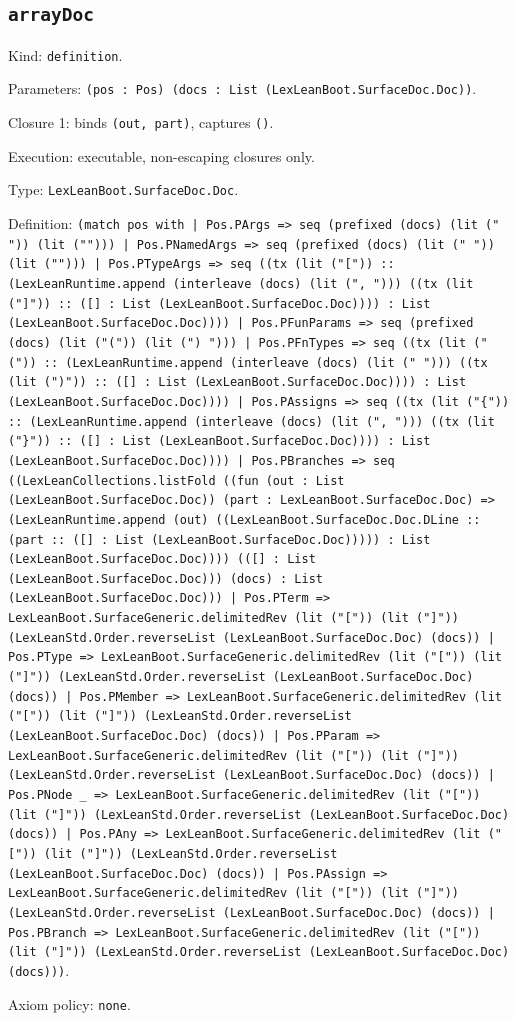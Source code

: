 \documentclass[11pt]{article}
\begin{document}
\subsection*{\texttt{arrayDoc}}
\noindent Kind: \texttt{definition}.\par
\noindent Parameters: \texttt{(pos : Pos) (docs : List (LexLeanBoot.SurfaceDoc.Doc))}.\par
\noindent Closure 1: binds \texttt{(out, part)}, captures \texttt{()}.\par
\noindent Execution: executable, non-escaping closures only.\par
\noindent Type: \texttt{LexLeanBoot.SurfaceDoc.Doc}.\par
\noindent Definition: \texttt{(match pos with | Pos.PArgs => seq (prefixed (docs) (lit (" ")) (lit (""))) | Pos.PNamedArgs => seq (prefixed (docs) (lit (" ")) (lit (""))) | Pos.PTypeArgs => seq ((tx (lit ("[")) :: (LexLeanRuntime.append (interleave (docs) (lit (", "))) ((tx (lit ("]")) :: ([] : List (LexLeanBoot.SurfaceDoc.Doc)))) : List (LexLeanBoot.SurfaceDoc.Doc)))) | Pos.PFunParams => seq (prefixed (docs) (lit ("(")) (lit (") "))) | Pos.PFnTypes => seq ((tx (lit ("(")) :: (LexLeanRuntime.append (interleave (docs) (lit (" "))) ((tx (lit (")")) :: ([] : List (LexLeanBoot.SurfaceDoc.Doc)))) : List (LexLeanBoot.SurfaceDoc.Doc)))) | Pos.PAssigns => seq ((tx (lit ("\{")) :: (LexLeanRuntime.append (interleave (docs) (lit (", "))) ((tx (lit ("\}")) :: ([] : List (LexLeanBoot.SurfaceDoc.Doc)))) : List (LexLeanBoot.SurfaceDoc.Doc)))) | Pos.PBranches => seq ((LexLeanCollections.listFold ((fun (out : List (LexLeanBoot.SurfaceDoc.Doc)) (part : LexLeanBoot.SurfaceDoc.Doc) => (LexLeanRuntime.append (out) ((LexLeanBoot.SurfaceDoc.Doc.DLine :: (part :: ([] : List (LexLeanBoot.SurfaceDoc.Doc))))) : List (LexLeanBoot.SurfaceDoc.Doc)))) (([] : List (LexLeanBoot.SurfaceDoc.Doc))) (docs) : List (LexLeanBoot.SurfaceDoc.Doc))) | Pos.PTerm => LexLeanBoot.SurfaceGeneric.delimitedRev (lit ("[")) (lit ("]")) (LexLeanStd.Order.reverseList (LexLeanBoot.SurfaceDoc.Doc) (docs)) | Pos.PType => LexLeanBoot.SurfaceGeneric.delimitedRev (lit ("[")) (lit ("]")) (LexLeanStd.Order.reverseList (LexLeanBoot.SurfaceDoc.Doc) (docs)) | Pos.PMember => LexLeanBoot.SurfaceGeneric.delimitedRev (lit ("[")) (lit ("]")) (LexLeanStd.Order.reverseList (LexLeanBoot.SurfaceDoc.Doc) (docs)) | Pos.PParam => LexLeanBoot.SurfaceGeneric.delimitedRev (lit ("[")) (lit ("]")) (LexLeanStd.Order.reverseList (LexLeanBoot.SurfaceDoc.Doc) (docs)) | Pos.PNode \_ => LexLeanBoot.SurfaceGeneric.delimitedRev (lit ("[")) (lit ("]")) (LexLeanStd.Order.reverseList (LexLeanBoot.SurfaceDoc.Doc) (docs)) | Pos.PAny => LexLeanBoot.SurfaceGeneric.delimitedRev (lit ("[")) (lit ("]")) (LexLeanStd.Order.reverseList (LexLeanBoot.SurfaceDoc.Doc) (docs)) | Pos.PAssign => LexLeanBoot.SurfaceGeneric.delimitedRev (lit ("[")) (lit ("]")) (LexLeanStd.Order.reverseList (LexLeanBoot.SurfaceDoc.Doc) (docs)) | Pos.PBranch => LexLeanBoot.SurfaceGeneric.delimitedRev (lit ("[")) (lit ("]")) (LexLeanStd.Order.reverseList (LexLeanBoot.SurfaceDoc.Doc) (docs)))}.\par
\noindent Axiom policy: \texttt{none}.\par
\end{document}
